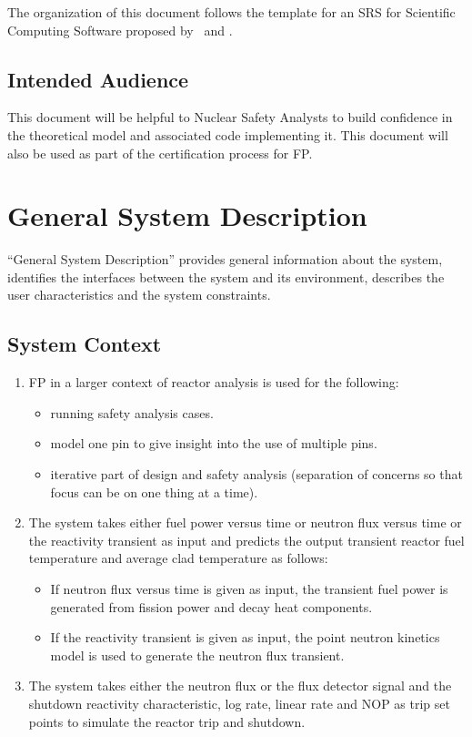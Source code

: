 The organization of this document follows the template for an SRS for Scientific
Computing Software proposed by~\cite{Lai2004} and \cite{SmithAndLai2005}.

\subsection{Intended Audience}

This document will be helpful to Nuclear Safety Analysts to build confidence in
the theoretical model and associated code implementing it. This document will
also be used as part of the certification process for FP.


\section{General System Description}

“General System Description” provides general information about the system,
identifies the interfaces between the system and its environment, describes the
user characteristics and the system constraints.

\subsection{System Context}

\begin{enumerate}
\item FP in a larger context of reactor analysis is used for the following:
\begin{itemize}
\item running safety analysis cases.
\item model one pin to give insight into the use of multiple pins.
\item iterative part of design and safety analysis (separation of concerns so
  that focus can be on one thing at a time).
\end{itemize}
\item The system takes either fuel power versus time or neutron flux versus time
  or the reactivity transient as input and predicts the output transient reactor
  fuel temperature and average clad temperature as follows:

\begin{itemize}
\item If neutron flux versus time is given as input, the transient fuel power is
  generated from fission power and decay heat components.
\item If the reactivity transient is given as input, the point neutron kinetics
  model is used to generate the neutron flux transient.
\end{itemize}
\item The system takes either the neutron flux or the flux detector signal and
  the shutdown reactivity characteristic, log rate, linear rate and NOP as trip
  set points to simulate the reactor trip and shutdown.

\end{enumerate}


